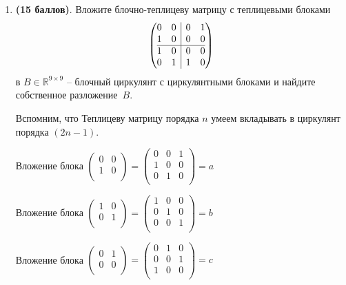 \documentclass[a4paper, 11pt]{article}
\newcommand{\prob}[1]{\item \textbf{(#1 баллов)}.}
\begin{document}
	
	\begin{enumerate}
		\prob{15} Вложите блочно-теплицеву матрицу с теплицевыми блоками 
		\[
		\left(\begin{array}{@{}c|c@{}}
			\begin{matrix}
				0 & 0 \\
				1 & 0
			\end{matrix}
			& 
			\begin{matrix}
				0 & 1 \\
				0 & 0
			\end{matrix}
			\\
			\hline
			\begin{matrix}
				1 & 0 \\
				0 & 1
			\end{matrix}
			&
			\begin{matrix}
				0 & 0 \\
				1 & 0
			\end{matrix}
		\end{array}\right)
		\]
		в $B\in\mathbb{R}^{9\times 9}$ -- блочный циркулянт с циркулянтными блоками и найдите собственное разложение~$B$.
		
		Вспомним, что Теплицеву матрицу порядка $n$ умеем вкладывать в циркулянт порядка $(2n - 1)$. 
		
		Вложение блока $\begin{pmatrix}
			0 & 0 \\
			1 & 0 \\
		\end{pmatrix} = \begin{pmatrix}
		0 & 0 & 1 \\
		1 & 0 & 0 \\
		0 & 1 & 0 \\
		\end{pmatrix} = a$
		
		Вложение блока $\begin{pmatrix}
			1 & 0 \\
			0 & 1 \\
		\end{pmatrix} = \begin{pmatrix}
			1 & 0 & 0 \\
			0 & 1 & 0 \\
			0 & 0 & 1 \\
		\end{pmatrix} = b$
		
		Вложение блока $\begin{pmatrix}
			0 & 1 \\
			0 & 0 \\
		\end{pmatrix} = \begin{pmatrix}
			0 & 1 & 0 \\
			0 & 0 & 1 \\
			1 & 0 & 0 \\
		\end{pmatrix} = c$
		

\end{enumerate}
\end{document}

